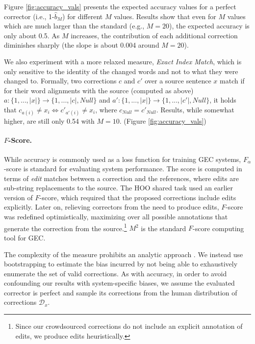 \documentclass[a4paper, 11pt]{article}
\begin{document}
Figure \ref{fig:accuracy_vals} presents the expected accuracy values for a perfect
corrector (i.e., 1-$\hat{b}_M$) for different  $M$ values. 
Results show that even for $M$ values which are much larger than the standard (e.g., $M=20$),
the expected accuracy is only about 0.5. As $M$ increases, the contribution of each additional correction 
diminishes sharply (the slope is about 0.004 around $M=20$).

We also experiment with a more relaxed measure, {\it Exact Index Match}, which is only sensitive to the identity of the changed words and not to what they were changed to. 
Formally, two corrections $c$ and $c'$ over a source sentence $x$ match if for their word alignments with the source (computed as above) $a:\{1,...,\left|x\right|\} \rightarrow \{1,...,\left|c\right|,Null\}$
and $a':\{1,...,\left|x\right|\} \rightarrow \{1,...,\left|c'\right|,Null\}$, it holds that $c_{a\left(i\right)} \neq x_{i} \Leftrightarrow c'_{a'\left(i\right)} \neq x_{i}$, where $c_{Null}=c'_{Null}$.
Results, while somewhat higher, are still only 0.54 with $M=10$. (Figure \ref{fig:accuracy_vals})

	\vspace{-0.1cm}
\paragraph{$F$-Score.}
While accuracy is commonly used as a loss function for training GEC systems,
$F_\alpha$-score is standard for evaluating system performance.
The score is computed in terms of {\it edit} matches between a correction and the references, where edits are sub-string replacements to the source.
The HOO shared task used an earlier version of $F$-score, which required that the proposed corrections include edits explicitly.
Later on, relieving correctors from the need to produce edits, $F$-score was redefined optimistically, maximizing over all possible annotations that generate the correction from the source.\footnote{Since our crowdsourced corrections
	do not include an explicit annotation of edits, we produce edits heuristically.}
$M^2$ \cite{dahlmeier2012better} is the standard $F$-score computing tool for GEC.

The complexity of the measure prohibits an analytic approach \cite{yeh2000more}.
We instead use bootstrapping to estimate the bias incurred by not being able to exhaustively enumerate the set of valid corrections.
As with accuracy, in order to avoid confounding our results with system-specific biases,
we assume the evaluated corrector is perfect and sample its corrections from the human distribution of corrections $\mathcal{D}_x$.
\end{document}

